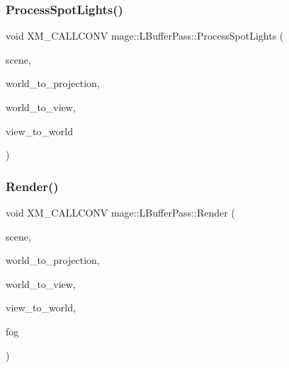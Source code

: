 \subsubsection{\texorpdfstring{Process\+Spot\+Lights()}{ProcessSpotLights()}}
{\footnotesize\ttfamily void X\+M\+\_\+\+C\+A\+L\+L\+C\+O\+NV mage\+::\+L\+Buffer\+Pass\+::\+Process\+Spot\+Lights (\begin{DoxyParamCaption}\item[{const \hyperlink{classmage_1_1_scene}{Scene} \&}]{scene,  }\item[{F\+X\+M\+M\+A\+T\+R\+IX}]{world\+\_\+to\+\_\+projection,  }\item[{C\+X\+M\+M\+A\+T\+R\+IX}]{world\+\_\+to\+\_\+view,  }\item[{C\+X\+M\+M\+A\+T\+R\+IX}]{view\+\_\+to\+\_\+world }\end{DoxyParamCaption})\hspace{0.3cm}{\ttfamily [private]}}

\hypertarget{classmage_1_1_l_buffer_pass_a701f7f6ad92abb4049f7ba625938b177}{}\label{classmage_1_1_l_buffer_pass_a701f7f6ad92abb4049f7ba625938b177} 
\subsubsection{\texorpdfstring{Render()}{Render()}}
{\footnotesize\ttfamily void X\+M\+\_\+\+C\+A\+L\+L\+C\+O\+NV mage\+::\+L\+Buffer\+Pass\+::\+Render (\begin{DoxyParamCaption}\item[{const \hyperlink{classmage_1_1_scene}{Scene} \&}]{scene,  }\item[{F\+X\+M\+M\+A\+T\+R\+IX}]{world\+\_\+to\+\_\+projection,  }\item[{C\+X\+M\+M\+A\+T\+R\+IX}]{world\+\_\+to\+\_\+view,  }\item[{C\+X\+M\+M\+A\+T\+R\+IX}]{view\+\_\+to\+\_\+world,  }\item[{const \hyperlink{classmage_1_1_fog}{Fog} \&}]{fog }\end{DoxyParamCaption})}

\hypertarget{classmage_1_1_l_buffer_pass_af14f7c85f15f6d5837a469956545daac}{}\label{classmage_1_1_l_buffer_pass_af14f7c85f15f6d5837a469956545daac} 
